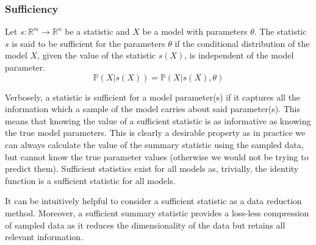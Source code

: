 \documentclass[bibliography=totoc,11pt,a4paper,margin=0]{article}
\newcommand*{\prob}{\mathbb{P}}
\theoremstyle{break}
\begin{document}
\subsubsection*{Sufficiency}\label{sec_sufficiency}

  \begin{box_definition}\label{def_sufficient_statistic}
    Let $s:\mathbb{R}^m\to\mathbb{R}^n$ be a statistic and $X$ be a model with parameters $\theta$. The statistic $s$ is said to be sufficient for the parameters $\theta$ if the conditional distribution of the model $X$, given the value of the statistic $s(X)$, is independent of the model parameter.
    \[ \prob(X|s(X))=\prob(X|s(X),\theta) \]
  \end{box_definition}

  \par Verbosely, a statistic is sufficient for a model parameter(s) if it captures all the information which a sample of the model carries about said parameter(s). This means that knowing the value of a sufficient statistic is as informative as knowing the true model parameters. This is clearly a desirable property as in practice we can always calculate the value of the summary statistic using the sampled data, but cannot know the true parameter values (otherwise we would not be trying to predict them). Sufficient statistics exist for all models as, trivially, the identity function is a sufficient statistic for all models.

  \par It can be intuitively helpful to consider a sufficient statistic as a data reduction method. Moreover, a sufficient summary statistic provides a loss-less compression of sampled data as it reduces the dimensionality of the data but retains all relevant information.
\end{document}
